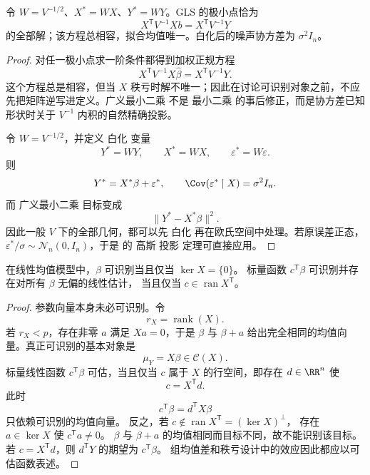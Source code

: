 \begin{proposition}[白化与正规方程]

令 $W=V^{-1/2}$、$X^*=WX$、$Y^*=WY$。GLS 的极小点恰为
\[
 X^{\mathsf T}V^{-1}Xb=X^{\mathsf T}V^{-1}Y
\]
的全部解；该方程总相容，拟合均值唯一。白化后的噪声协方差为 $\sigma^2I_n$。

\end{proposition}
\begin{proof}
对任一极小点求一阶条件都得到加权正规方程
\begin{equation*}X^{\mathsf T}V^{-1}X\widehat\beta
 =X^{\mathsf T}V^{-1}Y.
\end{equation*}
这个方程总是相容，但当 $X$ 秩亏时解不唯一；因此在讨论可识别对象之前，不应先把矩阵逆写进定义。广义最小二乘 不是 最小二乘 的事后修正，而是协方差已知形状时关于 $V^{-1}$ 内积的自然精确投影。

令 $W=V^{-1/2}$，并定义 白化 变量
\[
 Y^*=WY,
 \qquad
 X^*=WX,
 \qquad
 \varepsilon^*=W\varepsilon.
\]
则
\[
 Y^*=X^*\beta+\varepsilon^*,
 \qquad
 \Cov(\varepsilon^*\mid X)=\sigma^2I_n.
\]
而 广义最小二乘 目标变成
\[
 \|Y^*-X^*\beta\|^2.
\]
因此一般 $V$ 下的全部几何，都可以先 白化 再在欧氏空间中处理。若原误差正态，$\varepsilon^*/\sigma\sim\mathcal N_n(0,I_n)$，于是  的 高斯 投影 定理可直接应用。
\end{proof}

\begin{proposition}[秩亏设计与可估函数]

\label{prop:math-linear-estimability}
在线性均值模型中，$\beta$ 可识别当且仅当 $\ker X=\{0\}$。
标量函数 $c^{\mathsf T}\beta$ 可识别并存在对所有 $\beta$ 无偏的线性估计，
当且仅当 $c\in\operatorname{ran}X^{\mathsf T}$。

\end{proposition}
\begin{proof}
参数向量本身未必可识别。令
\[
 r_X=\operatorname{rank}(X).
\]
若 $r_X<p$，存在非零 $a$ 满足 $Xa=0$，于是 $\beta$ 与 $\beta+a$ 给出完全相同的均值向量。真正可识别的基本对象是
\[
 \mu_Y=X\beta\in\mathcal C(X).
\]
标量线性函数 $c^{\mathsf T}\beta$ 可估，当且仅当 $c$ 属于 $X$ 的行空间，即存在 $d\in\RR^n$ 使
\begin{equation*}c=X^{\mathsf T}d.
\end{equation*}
此时
\[
 c^{\mathsf T}\beta=d^{\mathsf T}X\beta
\]
只依赖可识别的均值向量。
反之，若 $c\notin\operatorname{ran}X^{\mathsf T}=(\ker X)^\perp$，
存在 $a\in\ker X$ 使 $c^{\mathsf T}a\ne0$。
$\beta$ 与 $\beta+a$ 的均值相同而目标不同，故不能识别该目标。
若 $c=X^{\mathsf T}d$，则 $d^{\mathsf T}Y$ 的期望为 $c^{\mathsf T}\beta$。
组均值差和秩亏设计中的效应因此都应以可估函数表述。

\end{proof}

